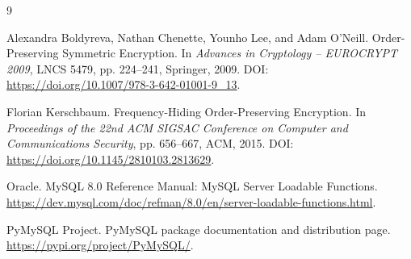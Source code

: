 \documentclass[UTF8,a4paper,12pt]{ctexart}
\begin{document}
\begin{thebibliography}{9}

Alexandra Boldyreva, Nathan Chenette, Younho Lee, and Adam O'Neill.
\newblock Order-Preserving Symmetric Encryption.
\newblock In \emph{Advances in Cryptology -- EUROCRYPT 2009}, LNCS 5479, pp. 224--241, Springer, 2009.
\newblock DOI: \url{https://doi.org/10.1007/978-3-642-01001-9_13}.

Florian Kerschbaum.
\newblock Frequency-Hiding Order-Preserving Encryption.
\newblock In \emph{Proceedings of the 22nd ACM SIGSAC Conference on Computer and Communications Security}, pp. 656--667, ACM, 2015.
\newblock DOI: \url{https://doi.org/10.1145/2810103.2813629}.

Oracle.
\newblock MySQL 8.0 Reference Manual: MySQL Server Loadable Functions.
\newblock \url{https://dev.mysql.com/doc/refman/8.0/en/server-loadable-functions.html}.

PyMySQL Project.
\newblock PyMySQL package documentation and distribution page.
\newblock \url{https://pypi.org/project/PyMySQL/}.

\end{thebibliography}
\end{document}
